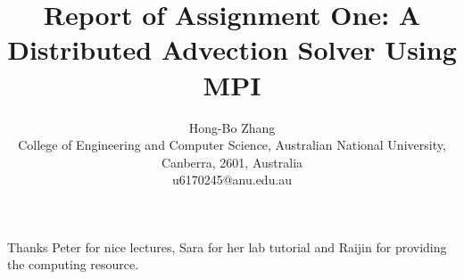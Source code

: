 \documentclass[11pt,assignment]{HONGBOANU}
\title{Report of Assignment One: A Distributed Advection Solver Using MPI}
\author{Hong-Bo Zhang\\
College of Engineering and Computer Science, Australian National University, Canberra, 2601, Australia\\
u6170245@anu.edu.au}
\begin{document}
\newpage















\acknowledgments
Thanks Peter for nice lectures, Sara for her lab tutorial and  Raijin for providing the computing resource.
\appendix




\end{document}
